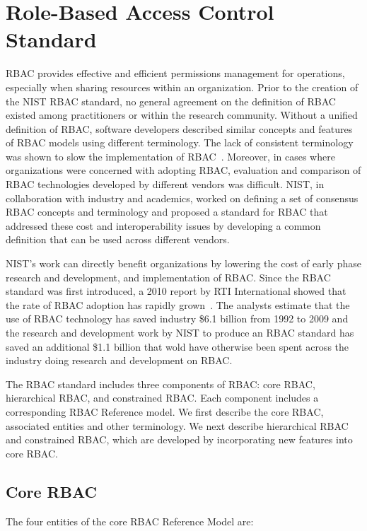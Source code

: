 \section{Role-Based Access Control Standard} \label{sec:core-rbac}

RBAC provides effective and efficient permissions management for operations, especially when sharing resources within an organization.
Prior to the creation of the NIST RBAC standard, no general agreement on the definition 
of RBAC existed among practitioners or within the research community. 
Without a unified definition of RBAC, software developers described similar concepts and features of RBAC models using different terminology. 
The lack of consistent terminology was shown to slow the implementation of RBAC~\cite{o20102010}.  
Moreover, in cases where organizations were concerned with adopting RBAC,
evaluation and comparison of RBAC technologies developed by different vendors was difficult.
NIST, in collaboration with industry and academics, worked on defining a set of consensus RBAC concepts and terminology and proposed a standard for 
RBAC that addressed these cost and interoperability issues by developing a common definition that can be used across different vendors.

NIST's work can directly benefit organizations by lowering the cost of early phase research and development, and implementation of RBAC.
Since the RBAC standard was first introduced, a 2010 report by RTI International showed that the rate of RBAC adoption has rapidly grown~\cite{o20102010}. 
The analysts estimate that the use of RBAC technology has saved industry \$6.1 billion from 1992 to 2009 and the research and development work by NIST to produce an RBAC standard has saved an additional \$1.1 billion that wold have otherwise been spent across the industry doing research and development on RBAC.

The RBAC standard includes three components of RBAC: core RBAC, hierarchical RBAC, and constrained RBAC. Each component includes a corresponding RBAC Reference model. We first describe the core RBAC, associated entities and other terminology. We next describe hierarchical RBAC and constrained RBAC, which are developed by incorporating new features into core RBAC. 

\subsection{Core RBAC} 

The four entities of the core RBAC Reference Model are:

